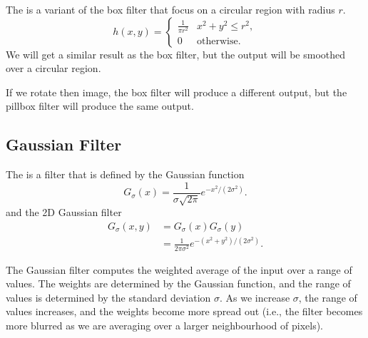 The  is a variant of the box filter that focus on a circular region with radius $r$. \[
    h(x, y) = \begin{cases}
        \displaystyle
        \frac{1}{\pi r^2} & x^2 + y^2 \leq r^2, \\
        0                 & \text{otherwise}.
    \end{cases}
\] We will get a similar result as the box filter, but the output will be smoothed over a circular region.

\begin{remark}
    If we rotate then image, the box filter will produce a different output, but the pillbox filter will produce the same output.
\end{remark}

\subsection{Gaussian Filter}

The  is a filter that is defined by the Gaussian function \[
    G_{\sigma}(x) = \frac{1}{\sigma\sqrt{2\pi}} e^{-x^2 / (2\sigma^2)}.
\] and the 2D Gaussian filter \begin{align*}
    G_{\sigma}(x, y) & = G_{\sigma}(x) G_{\sigma}(y)                            \\
                     & = \frac{1}{2\pi\sigma^2} e^{-(x^2 + y^2) / (2\sigma^2)}.
\end{align*}

The Gaussian filter computes the weighted average of the input over a range of values. The weights are determined by the Gaussian function, and the range of values is determined by the standard deviation $\sigma$. As we increase $\sigma$, the range of values increases, and the weights become more spread out (i.e., the filter becomes more blurred as we are averaging over a larger neighbourhood of pixels).


